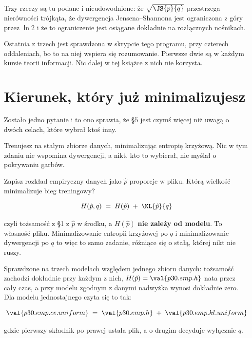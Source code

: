 \begin{fr}
\begin{rigourbox}
Trzy rzeczy są tu podane i nieudowodnione: że $\sqrt{\JS{p}{q}}$ przestrzega
nierówności trójkąta, że dywergencja Jensena--Shannona jest ograniczona z
góry przez $\ln 2$ i że to ograniczenie jest osiągane dokładnie na
rozłącznych nośnikach.

Ostatnia z trzech jest sprawdzona w skrypcie tego programu, przy czterech
oddaleniach, bo to na niej wspiera się rozumowanie. Pierwsze dwie są w
każdym kursie teorii informacji. Nic dalej w tej książce z nich nie
korzysta.
\end{rigourbox}
\end{fr}

\section{Kierunek, który już minimalizujesz}
\label{sec:P30-empirical}

\begin{fr}
Zostało jedno pytanie i to ono sprawia, że §5 jest czymś więcej niż uwagą o
dwóch celach, które wybrał ktoś inny.

Trenujesz na stałym zbiorze danych, minimalizując entropię krzyżową. Nic w
tym zdaniu nie wspomina dywergencji, a nikt, kto to wybierał, nie myślał o
pokrywaniu garbów.

Zapisz rozkład empiryczny danych jako $\hat p$ \dash{} proporcje w pliku.
Którą wielkość minimalizuje bieg treningowy?
\dotline
\nextframe
\end{fr}

\begin{fr}

\[ H(\hat p, q) \;=\; H(\hat p) \;+\; \KL{\hat p}{q} \]

czyli tożsamość z §1 z $\hat p$ w środku, a $H(\hat p)$ \textbf{nie zależy
od modelu}. To własność pliku. Minimalizowanie entropii krzyżowej po $q$ i
minimalizowanie dywergencji po $q$ to więc to samo zadanie, różniące się o
stałą, której nikt nie ruszy.

Sprawdzone na trzech modelach względem jednego zbioru danych: tożsamość
zachodzi dokładnie przy każdym z nich, $H(\hat p) = \val{p30.emp.h}$ nata
przez cały czas, a przy modelu zgodnym z danymi nadwyżka wynosi dokładnie
zero. Dla modelu jednostajnego czyta się to tak:

\[ \val{p30.emp.ce.uniform} \;=\; \val{p30.emp.h} \;+\; \val{p30.emp.kl.uniform} \]

gdzie pierwszy składnik po prawej ustala plik, a o drugim decyduje wyłącznie
$q$.
\end{fr}


